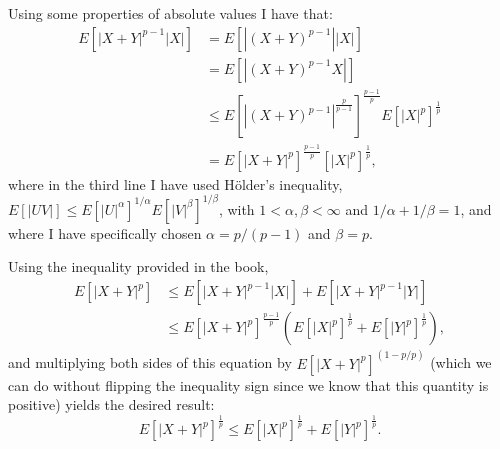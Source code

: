 \begin{problem}{24}
Using some properties of absolute values I have that:
\begin{align*}
E[|X+Y|^{p-1}|X|] &= E[|(X+Y)^{p-1}| |X|] \\
& =E[|(X+Y)^{p-1}X|]\\
& \le E[|(X+Y)^{p-1}|^{\frac{p}{p-1}}]^{\frac{p-1}{p}}E[|X|^p]^{\frac{1}{p}}\\
&=E[|X+Y|^p]^{\frac{p-1}{p}}[|X|^p]^{\frac{1}{p}},
\end{align*}
where in the third line I have used H{\"o}lder's inequality, $E[|UV|] \le E[|U|^\alpha]^{1/\alpha}E[|V|^\beta]^{1/\beta}$, with $1<\alpha, \beta< \infty$ and $1/\alpha+1/\beta=1$, and where I have specifically chosen $\alpha=p/(p-1)$ and $\beta=p$.

Using the inequality provided in the book,
\begin{align*}
E[|X+Y|^p] & \le E[|X+Y|^{p-1}|X|] +E[|X+Y|^{p-1}|Y|] \\ 
& \le E[|X+Y|^p]^{\frac{p-1}{p}}(E[|X|^p]^{\frac{1}{p}}+E[|Y|^p]^{\frac{1}{p}}),
\end{align*}
and multiplying both sides of this equation by $E[|X+Y|^p]^{(1-p/p)}$ (which we can do without flipping the inequality sign since we know that this quantity is positive) yields the desired result:
\begin{equation*}
E[|X+Y|^p] ^{\frac{1}{p}}\le E[|X|^p]^{\frac{1}{p}}+E[|Y|^p]^{\frac{1}{p}}.
\end{equation*}

\end{problem}


